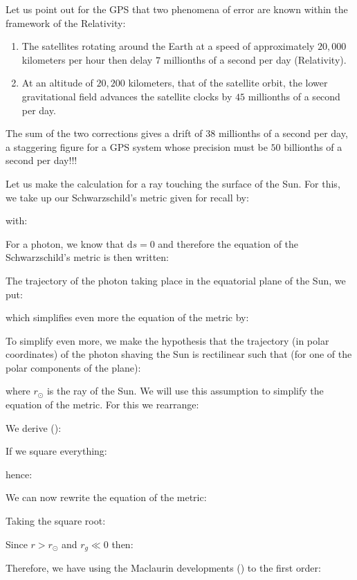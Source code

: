 	Let us point out for the GPS that two phenomena of error are known within the framework of the Relativity:
	\begin{enumerate}
		\item The satellites rotating around the Earth at a speed of approximately $20,000$ kilometers per hour then delay $7$ millionths of a second per day (Relativity).

		\item At an altitude of $20,200$ kilometers, that of the satellite orbit, the lower gravitational field advances the satellite clocks by $45$ millionths of a second per day.
	\end{enumerate}
	The sum of the two corrections gives a drift of $38$ millionths of a second per day, a staggering figure for a GPS system whose precision must be $50$ billionths of a second per day!!!

	Let us make the calculation for a ray touching the surface of the Sun. For this, we take up our Schwarzschild's metric given for recall by:
	
	with:
	
	For a photon, we know that $\mathrm{d}s=0$ and therefore the equation of the Schwarzschild's metric is then written:
	
	The trajectory of the photon taking place in the equatorial plane of the Sun, we put:
	
	which simplifies even more the equation of the metric by:
	
	To simplify even more, we make the hypothesis that the trajectory (in polar coordinates) of the photon shaving the Sun is rectilinear such that (for one of the polar components of the plane):
	
	where $r_\odot$ is the ray of the Sun. We will use this assumption to simplify the equation of the metric. For this we rearrange:
	
	We derive ():
	
	If we square everything:
	
	hence:
	
	We can now rewrite the equation of the metric:
	
	Taking the square root:
	
	Since $r>r_\odot$ and $r_g\ll 0$ then:
	
	Therefore, we have using the Maclaurin developments () to the first order:
	
